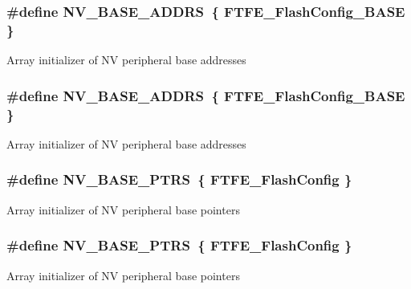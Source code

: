\subsubsection[{\texorpdfstring{N\+V\+\_\+\+B\+A\+S\+E\+\_\+\+A\+D\+D\+RS}{NV_BASE_ADDRS}}]{\setlength{\rightskip}{0pt plus 5cm}\#define N\+V\+\_\+\+B\+A\+S\+E\+\_\+\+A\+D\+D\+RS~\{ {\bf F\+T\+F\+E\+\_\+\+Flash\+Config\+\_\+\+B\+A\+SE} \}}\hypertarget{group__NV__Peripheral__Access__Layer_ga59a94e9ecd6653c2a47bc205a8c0ba4c}{}\label{group__NV__Peripheral__Access__Layer_ga59a94e9ecd6653c2a47bc205a8c0ba4c}
Array initializer of NV peripheral base addresses 
\subsubsection[{\texorpdfstring{N\+V\+\_\+\+B\+A\+S\+E\+\_\+\+A\+D\+D\+RS}{NV_BASE_ADDRS}}]{\setlength{\rightskip}{0pt plus 5cm}\#define N\+V\+\_\+\+B\+A\+S\+E\+\_\+\+A\+D\+D\+RS~\{ {\bf F\+T\+F\+E\+\_\+\+Flash\+Config\+\_\+\+B\+A\+SE} \}}\hypertarget{group__NV__Peripheral__Access__Layer_ga59a94e9ecd6653c2a47bc205a8c0ba4c}{}\label{group__NV__Peripheral__Access__Layer_ga59a94e9ecd6653c2a47bc205a8c0ba4c}
Array initializer of NV peripheral base addresses 
\subsubsection[{\texorpdfstring{N\+V\+\_\+\+B\+A\+S\+E\+\_\+\+P\+T\+RS}{NV_BASE_PTRS}}]{\setlength{\rightskip}{0pt plus 5cm}\#define N\+V\+\_\+\+B\+A\+S\+E\+\_\+\+P\+T\+RS~\{ {\bf F\+T\+F\+E\+\_\+\+Flash\+Config} \}}\hypertarget{group__NV__Peripheral__Access__Layer_ga1e44e66a8945b675dcebb6fbd6bdc85b}{}\label{group__NV__Peripheral__Access__Layer_ga1e44e66a8945b675dcebb6fbd6bdc85b}
Array initializer of NV peripheral base pointers 
\subsubsection[{\texorpdfstring{N\+V\+\_\+\+B\+A\+S\+E\+\_\+\+P\+T\+RS}{NV_BASE_PTRS}}]{\setlength{\rightskip}{0pt plus 5cm}\#define N\+V\+\_\+\+B\+A\+S\+E\+\_\+\+P\+T\+RS~\{ {\bf F\+T\+F\+E\+\_\+\+Flash\+Config} \}}\hypertarget{group__NV__Peripheral__Access__Layer_ga1e44e66a8945b675dcebb6fbd6bdc85b}{}\label{group__NV__Peripheral__Access__Layer_ga1e44e66a8945b675dcebb6fbd6bdc85b}
Array initializer of NV peripheral base pointers 